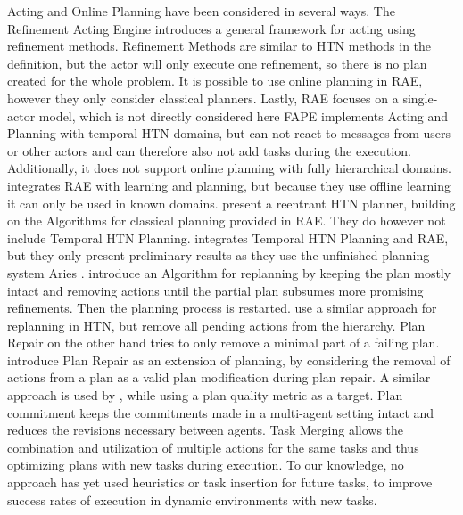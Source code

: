 Acting and Online Planning have been considered in several ways.
The Refinement Acting Engine \citep{ghallabAutomatedPlanningActing2016} introduces a general framework for acting using refinement methods.
Refinement Methods are similar to HTN methods in the definition, but the actor will only execute one refinement, so there is no plan created for the whole problem.
It is possible to use online planning in RAE, however they only consider classical planners. 
Lastly, RAE focuses on a single-actor model, which is not directly considered here
FAPE \citep{bit-monnotTemporalHierarchicalModels2016a} implements Acting and Planning with temporal HTN domains, but can not react to messages from users or other actors and can therefore also not add tasks during the execution.
Additionally, it does not support online planning with fully hierarchical domains.
\cite{patraIntegratingActingPlanning2020} integrates RAE with learning and planning, but because they use offline learning it can only be used in known domains.
\cite{bansodIntegratingPlanningActing2021} present a reentrant HTN planner, building on the Algorithms for classical planning provided in RAE.
They do however not include Temporal HTN Planning.
\cite{turiGuidanceRefinementbasedActing2022} integrates Temporal HTN Planning and RAE, but they only present preliminary results as they use the unfinished planning system Aries \citep{bit-monnotAries2024}.
\cite{boellaReplanningAlgorithmReactive2002} introduce an Algorithm for replanning by keeping the plan mostly intact and removing actions until the partial plan subsumes more promising refinements. Then the planning process is restarted.
\cite{bansodHTNReplanningMiddle2022} use a similar approach for replanning in HTN, but remove all pending actions from the hierarchy.
Plan Repair on the other hand tries to only remove a minimal part of a failing plan.
\cite{vanderkrogtPlanRepairExtension2005} introduce Plan Repair as an extension of planning, by considering the removal of actions from a plan as a valid plan modification during plan repair.
A similar approach is used by \cite{bajadaTemporalPlanQuality2014}, while using a plan quality metric as a target.
Plan commitment \citep{babliPlanCommitmentReplanning2023} keeps the commitments made in a multi-agent setting intact and reduces the revisions necessary between agents.
Task Merging \citep{stockOnlineTaskMerging2015} allows the combination and utilization of multiple actions for the same tasks and thus optimizing plans with new tasks during execution.
To our knowledge, no approach has yet used heuristics or task insertion for future tasks, to improve success rates of execution in dynamic environments with new tasks.
